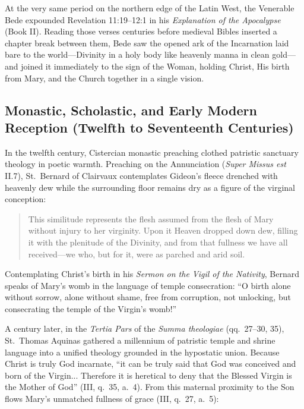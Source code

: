 At the very same period on the northern edge of the Latin West, the Venerable Bede expounded Revelation 11:19--12:1 in his \textit{Explanation of the Apocalypse} (Book II). Reading those verses centuries before medieval Bibles inserted a chapter break between them, Bede saw the opened ark of the Incarnation laid bare to the world---Divinity in a holy body like heavenly manna in clean gold---and joined it immediately to the sign of the Woman, holding Christ, His birth from Mary, and the Church together in a single vision.

\subsection{Monastic, Scholastic, and Early Modern Reception (Twelfth to Seventeenth Centuries)}

In the twelfth century, Cistercian monastic preaching clothed patristic sanctuary theology in poetic warmth. Preaching on the Annunciation (\textit{Super Missus est} II.7), St.\ Bernard of Clairvaux contemplates Gideon's fleece drenched with heavenly dew while the surrounding floor remains dry as a figure of the virginal conception:

\begin{quote}\small
This similitude represents the flesh assumed from the flesh of Mary without injury to her virginity. Upon it Heaven dropped down dew, filling it with the plenitude of the Divinity, and from that fullness we have all received---we who, but for it, were as parched and arid soil.
\end{quote}

Contemplating Christ's birth in his \textit{Sermon on the Vigil of the Nativity}, Bernard speaks of Mary's womb in the language of temple consecration: ``O birth alone without sorrow, alone without shame, free from corruption, not unlocking, but consecrating the temple of the Virgin's womb!''

A century later, in the \textit{Tertia Pars} of the \textit{Summa theologiae} (qq.\ 27--30, 35), St.\ Thomas Aquinas gathered a millennium of patristic temple and shrine language into a unified theology grounded in the hypostatic union. Because Christ is truly God incarnate, ``it can be truly said that God was conceived and born of the Virgin... Therefore it is heretical to deny that the Blessed Virgin is the Mother of God'' (III, q.\ 35, a.\ 4). From this maternal proximity to the Son flows Mary's unmatched fullness of grace (III, q.\ 27, a.\ 5):

